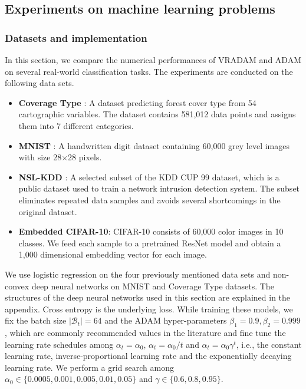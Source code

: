 \documentclass[twoside]{article}
\def\BB{\mathcal{B}}
\begin{document}
\subsection{Experiments on machine learning problems}
\subsubsection{Datasets and implementation}
In this section, we compare the numerical performances of VRADAM and ADAM on several real-world classification tasks. The experiments are conducted on the following data sets.
\begin{itemize}
    \item \textbf{Coverage Type} \cite{Blackard1998CoverType}: A dataset predicting forest cover type from 54 cartographic variables. The dataset contains 581,012 data points and assigns them into 7 different categories.
    \item \textbf{MNIST} \cite{deng2012mnist}: A handwritten digit dataset containing 60,000 grey level images with size 28$\times$28 pixels.  
    \item \textbf{NSL-KDD} \cite{tavallaee2009detailed}: A selected subset of the KDD CUP 99 dataset, which is a public dataset used to train a network intrusion detection system. The subset eliminates repeated data samples and avoids several shortcomings in the original dataset.
    \item \textbf{Embedded CIFAR-10}: CIFAR-10 \cite{krizhevsky2009learning} consists of 60,000 color images in 10 classes. We feed each sample to a pretrained ResNet model \cite{he2016deep} and obtain a 1,000 dimensional embedding vector for each image. 
\end{itemize}
We use logistic regression on the four previously mentioned data sets and non-convex deep neural networks on MNIST and Coverage Type datasets. The structures of the deep neural networks used in this section are explained in the appendix. Cross entropy is the underlying loss. While training these models, we fix the batch size $|\BB_t|=64$ and the ADAM hyper-parameters $\beta_1=0.9,\beta_2=0.999$, which are commonly recommended values in the literature and fine tune the learning rate schedules among $\alpha_t = \alpha_0$, $\alpha_t=\alpha_0/t$ and $\alpha_t = \alpha_0 \gamma ^t$, i.e., the constant learning rate, inverse-proportional learning rate and the exponentially decaying learning rate. We perform a grid search among $\alpha_0 \in \{0.0005, 0.001, 0.005, 0.01, 0.05\}$ and $\gamma \in\{0.6,0.8,0.95\}$.
\end{document}
